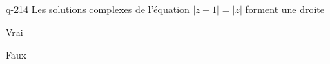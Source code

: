 \begin{truefalse}{q-214}
Les solutions complexes de l'équation $|z-1|=|z|$ forment une droite
\item* Vrai
\item Faux
\end{truefalse}

